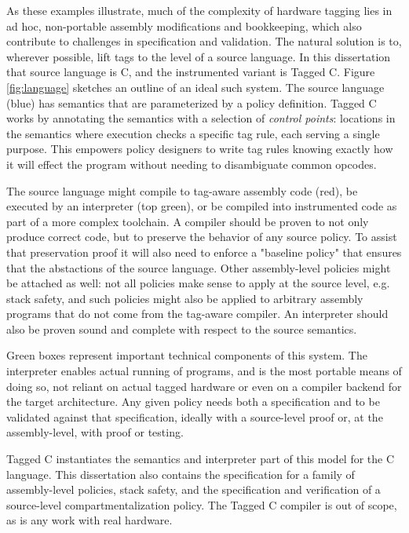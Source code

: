 \documentclass{report}
\begin{document}
As these examples illustrate, much of the complexity of hardware tagging lies in ad hoc,
non-portable assembly modifications and bookkeeping, which also contribute to challenges in
specification and validation. The natural solution is to, wherever possible, lift
tags to the level of a source language. In this dissertation that source language is C,
and the instrumented variant is Tagged C. Figure \ref{fig:language}
sketches an outline of an ideal such system. The source language (blue) has semantics that are
parameterized by a policy definition. Tagged C works by annotating the
semantics with a selection of {\em control points}: locations
in the semantics where execution checks a specific tag rule, each serving a single purpose.
This empowers policy designers to write tag rules knowing exactly how it will effect the
program without needing to disambiguate common opcodes.

The source language might compile to tag-aware assembly code (red), be executed by an
interpreter (top green), or be compiled into instrumented code as part of a more
complex toolchain. A compiler should be proven to not only
produce correct code, but to preserve the behavior of any source policy. To assist that preservation
proof it will also need to enforce a "baseline policy" that ensures that the abstactions of the
source language. Other assembly-level policies might be attached as well: not all policies make sense
to apply at the source level, e.g. stack safety, and such policies might also be applied to
arbitrary assembly programs that do not come from the tag-aware compiler.
An interpreter should also be proven sound and complete with respect to the source semantics.

Green boxes represent important technical components of this system. The interpreter enables
actual running of programs, and is the most portable means of doing so, not reliant on actual
tagged hardware or even on a compiler backend for the target architecture.
Any given policy needs both a specification and to be validated against that specification,
ideally with a source-level proof or, at the assembly-level, with proof or testing.

Tagged C instantiates the semantics and interpreter part of this model for the C language.
This dissertation also contains the specification for a family of assembly-level policies,
stack safety, and the specification and verification of a source-level compartmentalization
policy. The Tagged C compiler is out of scope, as is any work with real hardware.
\end{document}
